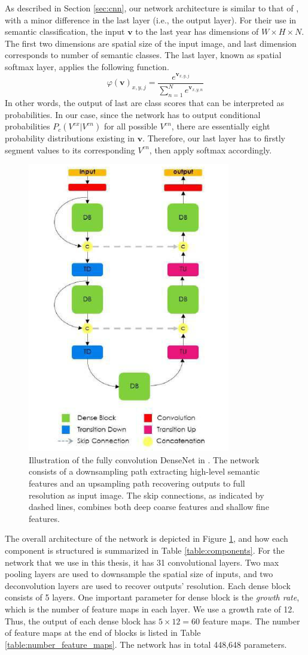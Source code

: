 As described in Section \ref{sec:cnn}, our network architecture is similar to that of \citet{jegou2017one}, with a minor difference in the last layer (i.e., the output layer). For their use in semantic classification, the input $\mathbf{v}$ to the last year has dimensions of $W\times H \times N$. The first two dimensions are spatial size of the input image, and last dimension corresponds to number of semantic classes. The last layer, known as spatial softmax layer, applies the following function.
\[\varphi(\mathbf{v})_{x, y, j} = \frac{e^{\mathbf{v}_{x, y, j}}}{\sum_{n=1}^N e^{\mathbf{v}_{x, y, n}}}\]
In other words, the output of last are class scores that can be interpreted as probabilities. In our case, since the network has to output conditional probabilities $P_c({V^{ex}|V^{en}})$ for all possible $V^{en}$, there are essentially eight probability distributions existing in $\mathbf{v}$. Therefore, our last layer has to firstly segment values to its corresponding $V^{en}$, then apply softmax accordingly. 

\begin{figure}[H]
  \centering
    \includegraphics[width=.45\textwidth]{figures/tiramisu.png}
    \caption[Illustration of the fully convolution DenseNet.]{Illustration of the fully convolution DenseNet in \citep{jegou2017one}. The network consists of a downsampling path extracting high-level semantic features and an upsampling path recovering outputs to full resolution as input image. The skip connections, as indicated by dashed lines, combines both deep coarse features and shallow fine features.}
    \label{fig:tiramisu}
\end{figure}

The overall architecture of the network is depicted in Figure \ref{fig:tiramisu}, and how each component is structured is summarized in Table \ref{table:components}. For the network that we use in this thesis, it has 31 convolutional layers. Two max pooling layers are used to downsample the spatial size of inputs, and two deconvolution layers are used to recover outputs' resolution. Each dense block consists of 5 layers. One important parameter for dense block is the \textit{growth rate}, which is the number of feature maps in each layer. We use a growth rate of 12. Thus, the output of each dense block has $5 \times 12 = 60$ feature maps. The number of feature maps at the end of blocks is listed in Table \ref{table:number_feature_maps}. The network has in total 448,648 parameters.

